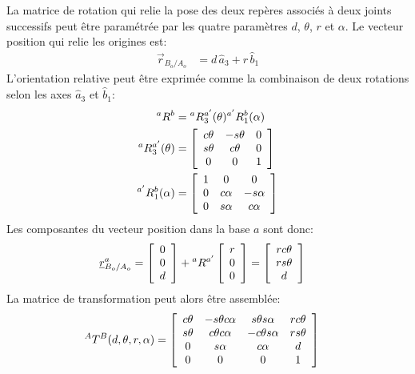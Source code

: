 La matrice de rotation qui relie la pose des deux repères associés à deux joints successifs peut être paramétrée par les quatre paramètres $d$, $\theta$, $r$ et $\alpha$. Le vecteur position qui relie les origines est:
\begin{align}
	\vec{r}_{B_o/A_o} &=  d \, \hat{a}_3 + r \, \hat{b}_1
\end{align}
L'orientation relative peut être exprimée comme la combinaison de deux rotations selon les axes $\hat{a}_3$ et $\hat{b}_1$:
\begin{align}
{}^aR^b &= {}^aR_3^{a'}(\theta) {}^{a'}R_1^b(\alpha) \\
{}^aR_3^{a'}(\theta)  &=
\left[ \begin{array}{c c c}
		   c\theta & -s\theta & 0 \\
		   s\theta & c\theta & 0 \\
		   0 & 0 & 1
\end{array}  \right]  \\
{}^{a'}R_1^b(\alpha)  &=
\left[ \begin{array}{c c c}
		   1 & 0 & 0 \\
		   0 & c\alpha & -s\alpha \\
		   0 & s\alpha & c\alpha
\end{array}  \right]
\end{align}
Les composantes du vecteur position dans la base $a$ sont donc:
\begin{align}
	\underline{r}_{B_o/A_o}^a &=
	\left[ \begin{array}{c}
			   0 \\
			   0 \\
			   d
	\end{array}  \right]  + {}^aR^{a'} \left[ \begin{array}{c}
												  r \\
												  0 \\
												  0
	\end{array}  \right]  = \left[ \begin{array}{c}
									   r c\theta \\
									   r s\theta \\
									   d
	\end{array}  \right]
\end{align}
La matrice de transformation peut alors être assemblée:
\begin{align}
{}^AT^{B}(d,\theta,r,\alpha) &=
\left[ \begin{array}{c c c c }
		   c\theta & -s\theta c\alpha & s\theta s\alpha & r c\theta\\
		   s\theta & c\theta c\alpha  & -c\theta s\alpha  & r s\theta\\
		   0 & s\alpha & c\alpha  &  d\\
		   0 & 0 & 0 & 1
\end{array}  \right]
\label{eq:Tdh}
\end{align}
